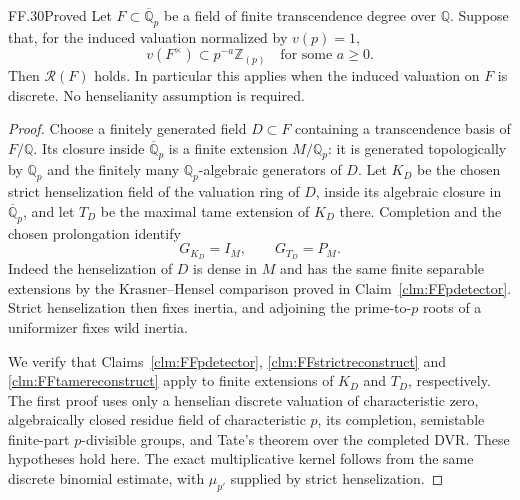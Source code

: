 \begin{claim}{FF.30}{Proved}\label{clm:FFpadicsubfields}
Let \(F\subset\overline{\mathbb Q}_p\) be a field
of finite transcendence degree over \(\mathbb Q\).
Suppose that, for the induced valuation normalized
by \(v(p)=1\),
\[
                  v(F^\times)\subset
                         p^{-a}\mathbb Z_{(p)}
                    \quad\text{for some }a\geq0.       \tag{FF.30.1}
\]
Then \(\mathcal R(F)\) holds. In particular this
applies when the induced valuation on \(F\) is
discrete. No henselianity assumption is required.
\end{claim}
\begin{proof}
Choose a finitely generated field
\(D\subset F\) containing a transcendence basis
of \(F/\mathbb Q\). Its closure inside
\(\overline{\mathbb Q}_p\) is a finite extension
\(M/\mathbb Q_p\): it is generated topologically
by \(\mathbb Q_p\) and the finitely many
\(\mathbb Q_p\)-algebraic generators of \(D\).
Let \(K_D\) be the chosen strict henselization
field of the valuation ring of \(D\), inside
its algebraic closure in
\(\overline{\mathbb Q}_p\), and let
\(T_D\) be the maximal tame extension of \(K_D\)
there. Completion and the chosen prolongation
identify
\[
               G_{K_D}=I_M,\qquad G_{T_D}=P_M.         \tag{FF.30.2}
\]
Indeed the henselization of \(D\) is dense in
\(M\) and has the same finite separable extensions
by the Krasner--Hensel comparison proved in
Claim~\ref{clm:FFpdetector}. Strict henselization
then fixes inertia, and adjoining the prime-to-\(p\)
roots of a uniformizer fixes wild inertia.

We verify that Claims~\ref{clm:FFpdetector},
\ref{clm:FFstrictreconstruct} and
\ref{clm:FFtamereconstruct} apply to finite
extensions of \(K_D\) and \(T_D\), respectively.
The first proof uses only a henselian discrete
valuation of characteristic zero, algebraically
closed residue field of characteristic \(p\),
its completion, semistable finite-part
\(p\)-divisible groups, and Tate's theorem over
the completed DVR. These hypotheses hold here.
The exact multiplicative kernel follows from
the same discrete binomial estimate, with
\(\mu_{p'}\) supplied by strict henselization.


\end{proof}
